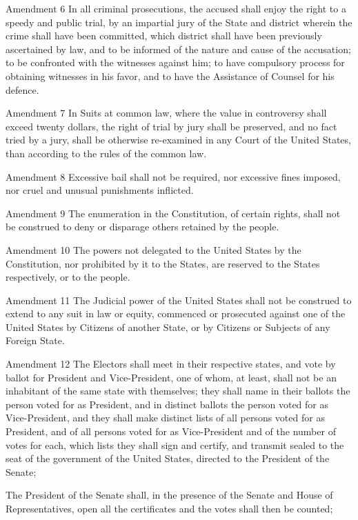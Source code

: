 \documentclass[12pt,a4paper]{article}
\begin{document}
Amendment 6
In all criminal prosecutions, the accused shall enjoy the right to a speedy and
public trial, by an impartial jury of the State and district wherein the crime
shall have been committed, which district shall have been previously
ascertained by law, and to be informed of the nature and cause of the
accusation; to be confronted with the witnesses against him; to have compulsory
process for obtaining witnesses in his favor, and to have the Assistance of
Counsel for his defence.

Amendment 7
In Suits at common law, where the value in controversy shall exceed twenty
dollars, the right of trial by jury shall be preserved, and no fact tried by a
jury, shall be otherwise re-examined in any Court of the United States, than
according to the rules of the common law.

Amendment 8
Excessive bail shall not be required, nor excessive fines imposed, nor cruel
and unusual punishments inflicted.

Amendment 9
The enumeration in the Constitution, of certain rights, shall not be construed
to deny or disparage others retained by the people.

Amendment 10
The powers not delegated to the United States by the Constitution, nor
prohibited by it to the States, are reserved to the States respectively, or to
the people.

Amendment 11
The Judicial power of the United States shall not be construed to extend to any
suit in law or equity, commenced or prosecuted against one of the United States
by Citizens of another State, or by Citizens or Subjects of any Foreign State.

Amendment 12
The Electors shall meet in their respective states, and vote by ballot for
President and Vice-President, one of whom, at least, shall not be an inhabitant
of the same state with themselves; they shall name in their ballots the person
voted for as President, and in distinct ballots the person voted for as
Vice-President, and they shall make distinct lists of all persons voted for as
President, and of all persons voted for as Vice-President and of the number of
votes for each, which lists they shall sign and certify, and transmit sealed to
the seat of the government of the United States, directed to the President of
the Senate;

The President of the Senate shall, in the presence of the Senate and House of
Representatives, open all the certificates and the votes shall then be counted;
\end{document}
